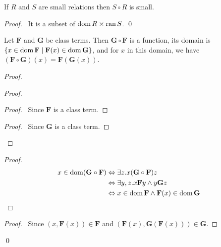 \begin{theorem}
    If $R$ and $S$ are small relations then $S \circ R$ is small.
\end{theorem}

\begin{proof}
    \pf\ It is a subset of $\operatorname{dom} R \times \operatorname{ran} S$. \qed
\end{proof}

\begin{theorem}[Pairing]
    \label{theorem:comp_function}
    Let $\mathbf{F}$ and $\mathbf{G}$ be class terms. Then $\mathbf{G} \circ \mathbf{F}$ is a function, its domain
    is $\{ x \in \operatorname{dom} \mathbf{F} \mid \mathbf{F}(x) \in \operatorname{dom} \mathbf{G} \}$, and for $x$ in this domain,
    we have $(\mathbf{F} \circ \mathbf{G})(x) = \mathbf{F}(\mathbf{G}(x))$.
\end{theorem}

\begin{proof}
    \pf
    \begin{proof}
        \begin{proof}
            \pf\ Since $\mathbf{F}$ is a class term.
        \end{proof}
        \begin{proof}
            \pf\ Since $\mathbf{G}$ is a class term.
        \end{proof}
    \end{proof}
    \begin{proof}
        \pf
        \begin{align*}
            x \in \operatorname{dom} (\mathbf{G} \circ \mathbf{F}) & \Leftrightarrow \exists z. x(\mathbf{G} \circ \mathbf{F})z \\
            & \Leftrightarrow \exists y, z. x\mathbf{F}y \wedge y\mathbf{G}z \\
            & \Leftrightarrow x \in \operatorname{dom} \mathbf{F} \wedge \mathbf{F}(x) \in \operatorname{dom} \mathbf{G}
        \end{align*}
    \end{proof}
    \begin{proof}
        \pf\ Since $(x,\mathbf{F}(x)) \in \mathbf{F}$ and $(\mathbf{F}(x),\mathbf{G}(\mathbf{F}(x))) \in \mathbf{G}$.
    \end{proof}
    \qed
\end{proof}

